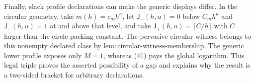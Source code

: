 Finally, slack profile declarations can make the generic displays differ.  In the circular geometry, take \(m(h)=c_mh^{\kappa}\), let \(\mathsf J_{-}(h,u)=0\) below \(C_mh^{\kappa}\) and \(\mathsf J_{-}(h,u)=1\) at and above that level, and take \(\mathsf J_{+}(h,u)=\lceil C/h\rceil\) with \(C\) larger than the circle-packing constant.  The pervasive circular witness belongs to this nonempty declared class by \(\mathrm{lem:circular\text{-}witness\text{-}membership}\).  The generic lower profile exposes only \(M=1\), whereas (41) pays the global logarithm.  This legal triple proves the asserted possibility of a gap and explains why the result is a two-sided bracket for arbitrary declarations.